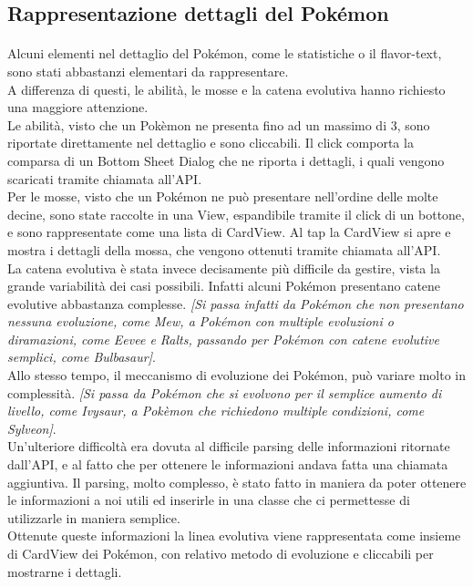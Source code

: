 \documentclass[a4paper,11pt]{article}
\begin{document}
  				\subsection{Rappresentazione dettagli del Pokémon}
  					\paragraph{}
  						Alcuni elementi nel dettaglio del Pokémon, come le statistiche o il flavor-text, sono stati abbastanzi elementari da rappresentare.\\
  						A differenza di questi, le abilità, le mosse e la catena evolutiva hanno richiesto una maggiore attenzione.\\
  						Le abilità, visto che un Pokèmon ne presenta fino ad un massimo di 3, sono riportate direttamente nel dettaglio e sono cliccabili. Il click comporta la comparsa di un Bottom Sheet Dialog che ne riporta i dettagli, i quali vengono scaricati tramite chiamata all’API.\\
  						Per le mosse, visto che un Pokémon ne può presentare nell’ordine delle molte decine, sono state raccolte in una View, espandibile tramite il click di un bottone, e sono rappresentate come una lista di CardView. Al tap la CardView si apre e mostra i dettagli della mossa, che vengono ottenuti tramite chiamata all’API.\\
  						La catena evolutiva è stata invece decisamente più difficile da gestire, vista la grande variabilità dei casi possibili. Infatti alcuni Pokémon presentano catene evolutive abbastanza complesse. \textit{[Si passa infatti da Pokémon che non presentano nessuna evoluzione, come Mew, a Pokémon con multiple evoluzioni o diramazioni, come Eevee e Ralts, passando per Pokémon con catene evolutive semplici, come Bulbasaur]}.\\
  						 Allo stesso tempo, il meccanismo di evoluzione dei Pokémon, può variare molto in complessità. \textit{[Si passa da Pokémon che si evolvono per il semplice aumento di livello, come Ivysaur, a Pokèmon che richiedono multiple condizioni, come Sylveon]}.\\
  						 Un’ulteriore difficoltà era dovuta al difficile parsing delle informazioni ritornate dall’API, e al fatto che per ottenere le informazioni andava fatta una chiamata aggiuntiva. Il parsing, molto complesso, è stato fatto in maniera da poter ottenere le informazioni a noi utili ed inserirle in una classe che ci permettesse di utilizzarle in maniera semplice.\\
  						 Ottenute queste informazioni la linea evolutiva viene rappresentata come insieme di CardView dei Pokémon, con relativo metodo di evoluzione e cliccabili per mostrarne i dettagli.
\end{document}
